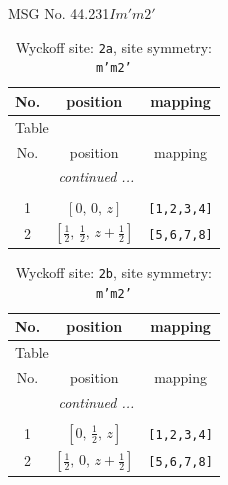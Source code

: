 \documentclass[fleqn,8pt]{jsarticle}
\begin{document}
\setcounter{MaxMatrixCols}{32}

\renewcommand{\tablename}{Table~}
\renewcommand{\figurename}{Figure~}
\begin{center}
\LARGE
MSG No. 44.231\quad$Im'm2'$
\end{center}
\renewcommand{\arraystretch}{1.2}
\begin{longtable}{ccc}
\caption{Wyckoff site: {\tt 2a}, site symmetry: {\tt m'm2'}}
 \\
 \hline \hline
No. & position & mapping \\ \hline \endfirsthead

\multicolumn{2}{l}{\tablename\ \thetable{}} \\
 \hline \hline
No. & position & mapping \\ \hline \endhead

 \hline \hline
\multicolumn{2}{r}{\footnotesize\it continued ...} \\ \endfoot

 \hline \hline
\multicolumn{2}{r}{} \\ \endlastfoot

1 & $\left[ 0,\, 0,\, z \right]$ & {\tt [1,2,3,4]} \\ \hline
2 & $\left[ \frac{1}{2},\, \frac{1}{2},\, z + \frac{1}{2} \right]$ & {\tt [5,6,7,8]} \\
\end{longtable}
\renewcommand{\arraystretch}{1.2}
\begin{longtable}{ccc}
\caption{Wyckoff site: {\tt 2b}, site symmetry: {\tt m'm2'}}
 \\
 \hline \hline
No. & position & mapping \\ \hline \endfirsthead

\multicolumn{2}{l}{\tablename\ \thetable{}} \\
 \hline \hline
No. & position & mapping \\ \hline \endhead

 \hline \hline
\multicolumn{2}{r}{\footnotesize\it continued ...} \\ \endfoot

 \hline \hline
\multicolumn{2}{r}{} \\ \endlastfoot

1 & $\left[ 0,\, \frac{1}{2},\, z \right]$ & {\tt [1,2,3,4]} \\ \hline
2 & $\left[ \frac{1}{2},\, 0,\, z + \frac{1}{2} \right]$ & {\tt [5,6,7,8]} \\
\end{longtable}
\end{document}
